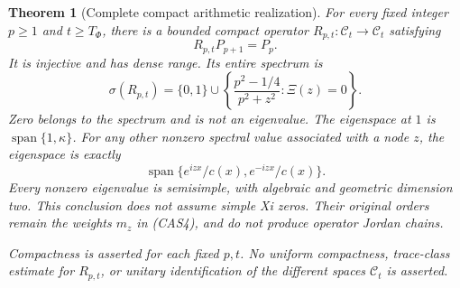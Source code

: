 \documentclass[11pt]{article}
\newtheorem{theorem}{Theorem}
\theoremstyle{remark}\newtheorem{remark}[theorem]{Remark}
\begin{document}
\begin{theorem}[Complete compact arithmetic realization]
\label{thm:compact-complete-arithmetic-spectrum}
For every fixed integer \(p\ge1\) and \(t\ge T_\Phi\), there is a bounded
compact operator \(R_{p,t}:\mathcal C_t\to\mathcal C_t\) satisfying
\[
 R_{p,t}P_{p+1}=P_p.                                    \tag{CAS7}
\]
It is injective and has dense range. Its entire spectrum is
\[
 \boxed{\ \sigma(R_{p,t})=\{0,1\}\cup
       \left\{\frac{p^2-1/4}{p^2+z^2}:\Xi(z)=0\right\}.\ } \tag{CAS8}
\]
Zero belongs to the spectrum and is not an eigenvalue. The eigenspace
at \(1\) is \(\operatorname{span}\{1,\kappa\}\). For any other nonzero
spectral value associated with a node \(z\), the eigenspace is exactly
\[
 \operatorname{span}\{e^{izx}/c(x),e^{-izx}/c(x)\}.        \tag{CAS9}
\]
Every nonzero eigenvalue is semisimple, with algebraic and geometric
dimension two. This conclusion does not assume simple Xi zeros.
Their original orders remain the weights \(m_z\) in (CAS4), and do
not produce operator Jordan chains.

Compactness is asserted for each fixed \(p,t\). No uniform
compactness, trace-class estimate for \(R_{p,t}\), or unitary
identification of the different spaces \(\mathcal C_t\) is asserted.
\end{theorem}
\end{document}
